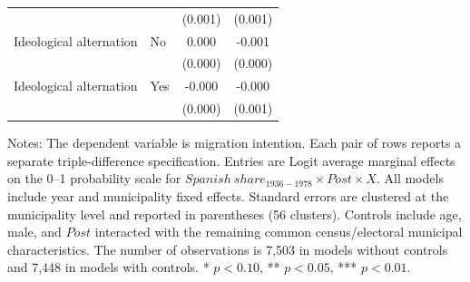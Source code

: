 \begin{table}[!htbp]
\begin{tabular}{llcc}
 & & (0.001) & (0.001) \\
\addlinespace
Ideological alternation & No & 0.000 & -0.001 \\
 & & (0.000) & (0.000) \\
Ideological alternation & Yes & -0.000 & -0.000 \\
 & & (0.000) & (0.001) \\
\hline
\end{tabular}
\par\vspace{1.5mm}
\begin{minipage}{0.98\linewidth}
\footnotesize\setlength{\parindent}{0pt}\setlength{\parskip}{1pt}
Notes: The dependent variable is migration intention. Each pair of rows reports a separate triple-difference specification. Entries are Logit average marginal effects on the 0--1 probability scale for \(Spanish\ share_{1936-1978} \times Post \times X\). All models include year and municipality fixed effects. Standard errors are clustered at the municipality level and reported in parentheses (56 clusters). Controls include age, male, and \(Post\) interacted with the remaining common census/electoral municipal characteristics. The number of observations is        7,503 in models without controls and        7,448 in models with controls. * \(p<0.10\), ** \(p<0.05\), *** \(p<0.01\).
\end{minipage}
\end{table}
